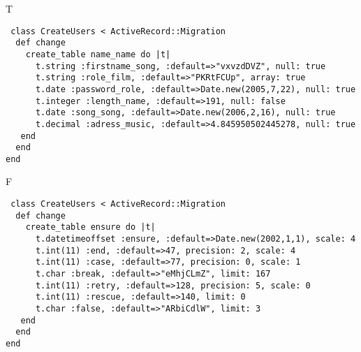 T
\begin{verbatim}
 class CreateUsers < ActiveRecord::Migration 
  def change 
    create_table name_name do |t| 
      t.string :firstname_song, :default=>"vxvzdDVZ", null: true
      t.string :role_film, :default=>"PKRtFCUp", array: true
      t.date :password_role, :default=>Date.new(2005,7,22), null: true
      t.integer :length_name, :default=>191, null: false
      t.date :song_song, :default=>Date.new(2006,2,16), null: true
      t.decimal :adress_music, :default=>4.845950502445278, null: true
   end 
  end 
end
\end{verbatim}

F
\begin{verbatim}
 class CreateUsers < ActiveRecord::Migration 
  def change 
    create_table ensure do |t| 
      t.datetimeoffset :ensure, :default=>Date.new(2002,1,1), scale: 4
      t.int(11) :end, :default=>47, precision: 2, scale: 4
      t.int(11) :case, :default=>77, precision: 0, scale: 1
      t.char :break, :default=>"eMhjCLmZ", limit: 167
      t.int(11) :retry, :default=>128, precision: 5, scale: 0
      t.int(11) :rescue, :default=>140, limit: 0
      t.char :false, :default=>"ARbiCdlW", limit: 3
   end 
  end 
end
\end{verbatim}
